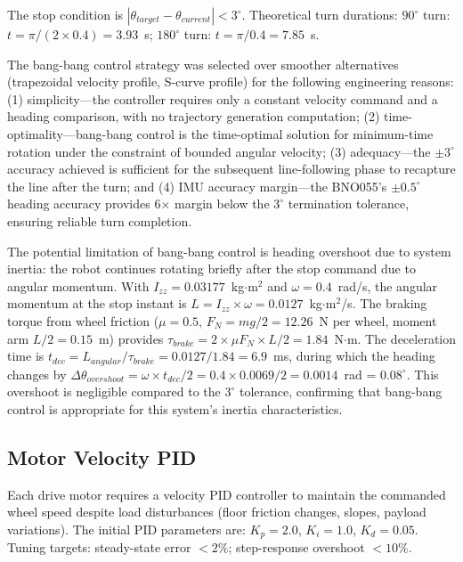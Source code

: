 \documentclass[12pt,a4paper,oneside]{report}
\begin{document}
The stop condition is $|\theta_{target} - \theta_{current}| < 3^{\circ}$. Theoretical turn durations: $90^{\circ}$ turn: $t = \pi/(2 \times 0.4) = 3.93$~s; $180^{\circ}$ turn: $t = \pi/0.4 = 7.85$~s.

The bang-bang control strategy was selected over smoother alternatives (trapezoidal velocity profile, S-curve profile) for the following engineering reasons: (1) simplicity---the controller requires only a constant velocity command and a heading comparison, with no trajectory generation computation; (2) time-optimality---bang-bang control is the time-optimal solution for minimum-time rotation under the constraint of bounded angular velocity; (3) adequacy---the $\pm 3^{\circ}$ accuracy achieved is sufficient for the subsequent line-following phase to recapture the line after the turn; and (4) IMU accuracy margin---the BNO055's $\pm 0.5^{\circ}$ heading accuracy provides 6$\times$ margin below the $3^{\circ}$ termination tolerance, ensuring reliable turn completion.

The potential limitation of bang-bang control is heading overshoot due to system inertia: the robot continues rotating briefly after the stop command due to angular momentum. With $I_{zz} = 0.03177$~kg$\cdot$m$^2$ and $\omega = 0.4$~rad/s, the angular momentum at the stop instant is $L = I_{zz} \times \omega = 0.0127$~kg$\cdot$m$^2$/s. The braking torque from wheel friction ($\mu = 0.5$, $F_N = mg/2 = 12.26$~N per wheel, moment arm $L/2 = 0.15$~m) provides $\tau_{brake} = 2 \times \mu F_N \times L/2 = 1.84$~N$\cdot$m. The deceleration time is $t_{dec} = L_{angular}/\tau_{brake} = 0.0127/1.84 = 6.9$~ms, during which the heading changes by $\Delta\theta_{overshoot} = \omega \times t_{dec}/2 = 0.4 \times 0.0069/2 = 0.0014$~rad = $0.08^{\circ}$. This overshoot is negligible compared to the $3^{\circ}$ tolerance, confirming that bang-bang control is appropriate for this system's inertia characteristics.

\subsection{Motor Velocity PID}

Each drive motor requires a velocity PID controller to maintain the commanded wheel speed despite load disturbances (floor friction changes, slopes, payload variations). The initial PID parameters are: $K_p = 2.0$, $K_i = 1.0$, $K_d = 0.05$. Tuning targets: steady-state error $< 2\%$; step-response overshoot $< 10\%$.
\end{document}
